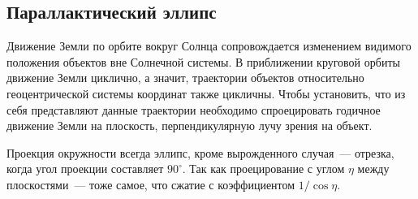 \subsection{Параллактический эллипс}
Движение Земли по орбите вокруг Солнца сопровождается изменением видимого положения объектов вне Солнечной системы. В приближении круговой орбиты движение Земли циклично, а значит, траектории объектов относительно геоцентрической системы координат также цикличны. Чтобы установить, что из себя представляют данные траектории необходимо спроецировать годичное движение Земли на плоскость, перпендикулярную лучу зрения на объект.

Проекция окружности всегда эллипс, кроме вырожденного случая~--- отрезка, когда угол проекции составляет $90^\circ$. Так как проецирование с углом $\eta$ между плоскостями~--- тоже самое, что сжатие с коэффициентом $1/\cos\eta$.

